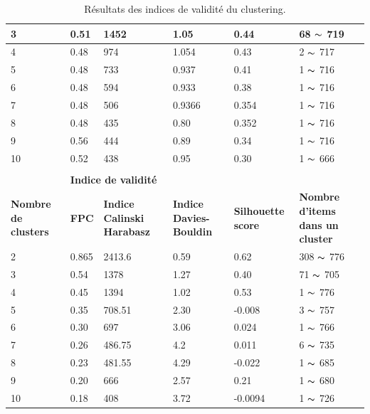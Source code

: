 \begin{table}[H]
\begin{tabular}{|m{2cm}|m{2cm}|m{2cm}|m{2cm}|m{2cm}|m{3cm}|}
	3  & 0.51 & 1452 & 1.05   & 0.44    &  68   \(\displaystyle \thicksim  \)  719  \\ \hline
	4  & 0.48 & 974  & 1.054  & 0.43    &  2    \(\displaystyle \thicksim  \)  717  \\ \hline
	5  & 0.48 & 733  & 0.937  & 0.41    &  1    \(\displaystyle \thicksim  \)  716  \\ \hline
	6  & 0.48 & 594  & 0.933  & 0.38    &  1    \(\displaystyle \thicksim  \)  716  \\ \hline
	7  & 0.48 & 506  & 0.9366 & 0.354   &  1    \(\displaystyle \thicksim  \)  716  \\ \hline
	8  & 0.48 & 435  & 0.80   & 0.352   &  1    \(\displaystyle \thicksim  \)  716  \\ \hline
	9  & 0.56 & 444  & 0.89   & 0.34    &  1    \(\displaystyle \thicksim  \)  716  \\ \hline
	10 & 0.52 & 438  & 0.95   & 0.30    &  1    \(\displaystyle \thicksim  \)  666  \\ \hline \hline
	\rowcolor{blueforest}
	\multicolumn{6}{|m{16cm}|}{\centering \color{white} \textbf{Fuzzy clustering} } \\ \hline
	&  \multicolumn{4}{|m{8cm}|}{\centering \textbf{Indice de validité} } & \\ \hline
	\textbf{Nombre de clusters}  &   \textbf{FPC} & \textbf{Indice Calinski Harabasz}& \textbf{Indice Davies-Bouldin} & \textbf{Silhouette score}  &  \textbf{Nombre d'items dans un cluster }\\ \hline
	2  & \cellcolor{gray!40} 0.865 & \cellcolor{gray!40} 2413.6  & \cellcolor{gray!40} 0.59   &  \cellcolor{gray!40} 0.62    &  308 \(\displaystyle \thicksim  \)  776  \\ \hline 	
	3  & 0.54  & 1378    & 1.27   &  0.40    &  71  \(\displaystyle \thicksim  \)  705 \\ \hline
	4  & 0.45  & 1394    & 1.02   &  0.53    &  1   \(\displaystyle \thicksim  \)  776 \\ \hline
	5  & 0.35  & 708.51  & 2.30   &  -0.008  &  3   \(\displaystyle \thicksim  \)  757 \\ \hline
	6  & 0.30  & 697     & 3.06   &  0.024   &  1   \(\displaystyle \thicksim  \)  766 \\ \hline
	7  & 0.26  & 486.75  & 4.2    &  0.011   &  6   \(\displaystyle \thicksim  \)  735 \\ \hline
	8  & 0.23  & 481.55  & 4.29   &  -0.022  &  1   \(\displaystyle \thicksim  \)  685 \\ \hline
	9  & 0.20  & 666     & 2.57   &  0.21    &  1   \(\displaystyle \thicksim  \)  680 \\ \hline
	10 & 0.18  & 408     & 3.72   &  -0.0094 &  1   \(\displaystyle \thicksim  \)  726 \\ \hline \hline
  \end{tabular}
	\caption{Résultats des indices de validité du clustering.}
	\label{clusters_indice_score}
\end{table}


